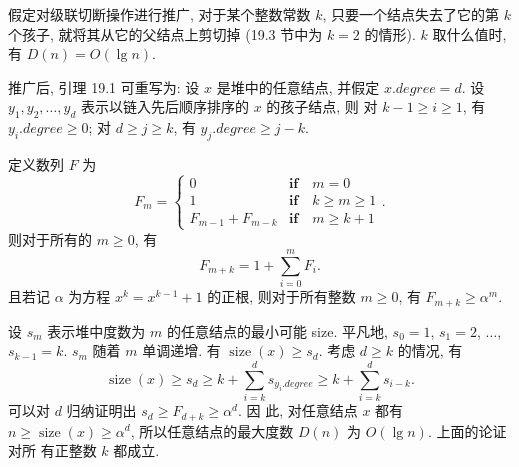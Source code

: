 \documentclass[boxes]{homework}
\begin{document}
\begin{problem}
假定对级联切断操作进行推广, 对于某个整数常数 $k$, 只要一个结点失去了它的第 $k$
个孩子, 就将其从它的父结点上剪切掉 (19.3 节中为 $k = 2$ 的情形). $k$ 取什么值时,
有 $D(n) = O(\lg n)$.
\end{problem}
\begin{solution}
    推广后, 引理 19.1 可重写为: 设 $x$ 是堆中的任意结点, 并假定 $x.degree = d$.
    设 $y_{1}, y_{2}, \ldots, y_{d}$ 表示以链入先后顺序排序的 $x$ 的孩子结点, 则
    对 $k - 1 \geqslant i \geqslant 1$, 有
    $y_{i}.degree \geqslant 0$; 对 $d \geqslant j \geqslant k$, 有
    $y_{j}.degree \geqslant j - k$.

    定义数列 $F$ 为
    \[
        F_{m} =
        \begin{cases}
            0                     & \mathbf{if} \quad m = 0                     \\
            1                     & \mathbf{if} \quad k \geqslant m \geqslant 1 \\
            F_{m - 1} + F_{m - k} & \mathbf{if} \quad m \geqslant k + 1
        \end{cases}
        .
    \]
    则对于所有的 $m \geqslant 0$, 有
    \[
        F_{m + k} = 1 + \sum_{i = 0}^{m} F_{i}
        .
    \]
    且若记 $\alpha$ 为方程 $x^{k} = x^{k - 1} + 1$ 的正根, 则对于所有整数
    $m \geqslant 0$, 有 $F_{m + k} \geqslant \alpha^{m}$.

    设 $s_{m}$ 表示堆中度数为 $m$ 的任意结点的最小可能 size. 平凡地, $s_{0}=1$,
    $s_{1} = 2$, $\ldots$, $s_{k - 1} = k$. $s_{m}$ 随着 $m$ 单调递增. 有
    $\operatorname{size}(x) \geqslant s_{d}$. 考虑 $d \geqslant k$ 的情况, 有
    \[
        \operatorname{size}(x) \geqslant s_{d} \geqslant k +
        \sum_{i = k}^{d} s_{y_{i}.degree} \geqslant k + \sum_{i = k}^{d}
        s_{i - k}
        .
    \]
    可以对 $d$ 归纳证明出 $s_{d} \geqslant F_{d + k} \geqslant \alpha^{d}$. 因
    此, 对任意结点 $x$ 都有 $n \geqslant \operatorname{size}(x) \geqslant
        \alpha^{d}$, 所以任意结点的最大度数 $D(n)$ 为 $O(\lg n)$. 上面的论证对所
    有正整数 $k$ 都成立.
\end{solution}
\end{document}
